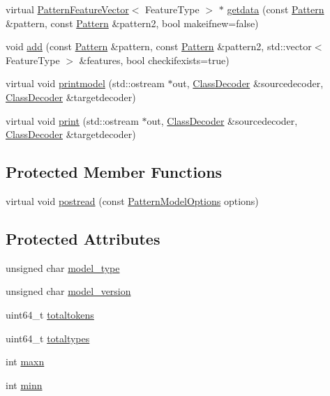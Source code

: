 \begin{DoxyCompactItemize}
\item 
virtual \hyperlink{classPatternFeatureVector}{Pattern\+Feature\+Vector}$<$ Feature\+Type $>$ $\ast$ \hyperlink{classPatternAlignmentModel_a653ae7ceb0293d8928be37ab705d8a52}{getdata} (const \hyperlink{classPattern}{Pattern} \&pattern, const \hyperlink{classPattern}{Pattern} \&pattern2, bool makeifnew=false)
\item 
void \hyperlink{classPatternAlignmentModel_aa190384f055bf69a6ae4becb66651722}{add} (const \hyperlink{classPattern}{Pattern} \&pattern, const \hyperlink{classPattern}{Pattern} \&pattern2, std\+::vector$<$ Feature\+Type $>$ \&features, bool checkifexists=true)
\item 
virtual void \hyperlink{classPatternAlignmentModel_a0fe0e90c0a32fc35292f0b871f652084}{printmodel} (std\+::ostream $\ast$out, \hyperlink{classClassDecoder}{Class\+Decoder} \&sourcedecoder, \hyperlink{classClassDecoder}{Class\+Decoder} \&targetdecoder)
\item 
virtual void \hyperlink{classPatternAlignmentModel_a862fcfacc9903ba08ec4f134264c5da4}{print} (std\+::ostream $\ast$out, \hyperlink{classClassDecoder}{Class\+Decoder} \&sourcedecoder, \hyperlink{classClassDecoder}{Class\+Decoder} \&targetdecoder)
\end{DoxyCompactItemize}
\subsection*{Protected Member Functions}
\begin{DoxyCompactItemize}
\item 
virtual void \hyperlink{classPatternAlignmentModel_a84553b3366b622baad68f3d8c2e87675}{postread} (const \hyperlink{classPatternModelOptions}{Pattern\+Model\+Options} options)
\end{DoxyCompactItemize}
\subsection*{Protected Attributes}
\begin{DoxyCompactItemize}
\item 
unsigned char \hyperlink{classPatternAlignmentModel_a7f24c75a6674ae6bbe70b9fd36286562}{model\+\_\+type}
\item 
unsigned char \hyperlink{classPatternAlignmentModel_ae697eaef720c1ba038fe444b6a7eccd5}{model\+\_\+version}
\item 
uint64\+\_\+t \hyperlink{classPatternAlignmentModel_ad346131805c2e639a0e223db07ba869a}{totaltokens}
\item 
uint64\+\_\+t \hyperlink{classPatternAlignmentModel_a36279cac113c61b57f4a95df6e0a07b7}{totaltypes}
\item 
int \hyperlink{classPatternAlignmentModel_a6d7688c2dcff6c341e2b0b05fa242cb0}{maxn}
\item 
int \hyperlink{classPatternAlignmentModel_a9d844ce6aeb1956b8f7c36e9df05ea17}{minn}
\end{DoxyCompactItemize}


